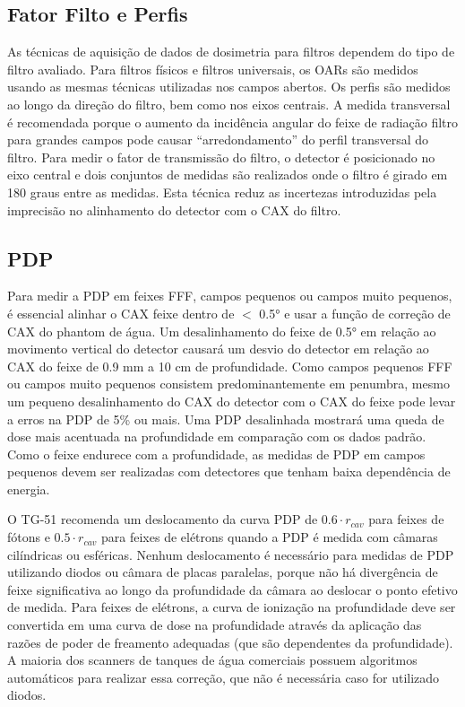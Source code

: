 \documentclass[11pt,a4paper]{article}
\begin{document}
\subsection{Fator Filto e Perfis}

	As técnicas de aquisição de dados de dosimetria para filtros dependem do tipo de filtro avaliado. Para filtros físicos e filtros universais, os OARs são medidos usando as mesmas técnicas utilizadas nos campos abertos. Os perfis são medidos ao longo da direção do filtro, bem como nos eixos centrais. A medida transversal é recomendada porque o aumento da incidência angular do feixe de radiação filtro para grandes campos pode causar “arredondamento” do perfil transversal do filtro. Para medir o fator de transmissão do filtro, o detector é posicionado no eixo central e dois conjuntos de medidas são realizados onde o filtro é girado em 180 graus entre as medidas. Esta técnica reduz as incertezas introduzidas pela imprecisão no alinhamento do detector com o CAX do filtro.

\subsection{PDP}

	Para medir a PDP em feixes  FFF, campos pequenos ou campos muito pequenos, é essencial alinhar o CAX feixe dentro de $<$ \ang{0.5} e usar a função de correção de CAX do phantom de água.  Um desalinhamento do feixe de \ang{0.5} em relação ao movimento vertical do detector causará um desvio do detector em relação ao CAX do feixe de 0.9 mm a 10 cm de profundidade. Como campos pequenos FFF ou campos muito pequenos consistem predominantemente em penumbra, mesmo um pequeno desalinhamento do CAX do detector com o CAX do feixe pode levar a erros na PDP de 5\% ou mais. Uma PDP desalinhada mostrará uma queda de dose mais acentuada na profundidade em comparação com os dados padrão. Como o feixe endurece com a profundidade, as medidas de PDP em campos pequenos devem ser realizadas com detectores que tenham baixa dependência de energia.

	O TG-51 recomenda um deslocamento da curva PDP de $0.6 \cdot r_{cav}$ para feixes de fótons e $0.5 \cdot r_{cav}$ para feixes de elétrons quando a PDP é medida com câmaras cilíndricas ou esféricas. Nenhum deslocamento é necessário para medidas de PDP utilizando diodos ou câmara de placas paralelas, porque não há divergência de feixe significativa ao longo da profundidade da câmara ao deslocar o ponto efetivo de medida. Para feixes de elétrons, a curva de ionização na profundidade deve ser convertida em uma curva de dose na profundidade através da aplicação das razões de poder de freamento adequadas (que são dependentes da profundidade). A maioria dos scanners de tanques de água comerciais possuem algoritmos automáticos para realizar essa correção, que não é necessária caso for utilizado diodos.
\end{document}
